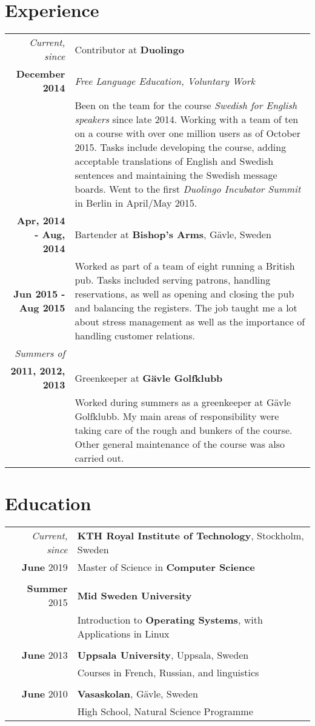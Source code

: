 \documentclass[a4paper,10pt]{article}
\begin{document}
\section{Experience}
\begin{tabular}{r|p{11cm}}
 \emph{Current, since} & Contributor at \textbf{Duolingo}\\\textbf{December 2014}&\emph{Free Language Education, Voluntary Work}\\&\footnotesize{Been on the team for the course \emph{Swedish for English speakers} since late 2014. Working with a team of ten on a course with over one million users as
 of October 2015. Tasks include developing the course, adding acceptable translations of English
 and Swedish sentences and maintaining the Swedish message boards. Went to the first \emph{Duolingo Incubator Summit} in Berlin in April/May 2015.}\\
\textbf{Apr, 2014 - Aug, 2014} & Bartender at \textbf{Bishop's Arms}, Gävle, Sweden \\ \textbf{Jun 2015 - Aug 2015}&\footnotesize{Worked as part of a team of eight running a British pub. Tasks included serving patrons, handling reservations, as well as opening and closing the pub and balancing the registers. The job taught me a lot about stress management as well as the importance of handling customer relations.}\\
\emph{Summers of}\\\textbf{2011, 2012, 2013} & Greenkeeper at \textbf{Gävle Golfklubb} \\
&\footnotesize{Worked during summers as a greenkeeper at Gävle Golfklubb. My main areas of responsibility were taking care of the rough and bunkers of the course. Other general maintenance of the course was also carried out.}
\end{tabular}

\section{Education}
\begin{tabular}{rl}
\emph{Current, since} & \textbf{KTH Royal Institute of Technology}, Stockholm, Sweden\\	
 \textbf{June} 2019 & Master of Science in \textbf{Computer Science}\\&\\
\textbf{Summer} 2015& \textbf{Mid Sweden University}\\& Introduction to \textbf{Operating Systems}, with Applications in Linux\\&\\
\textbf{June} 2013& \textbf{Uppsala University}, Uppsala, Sweden\\& Courses in French, Russian, and linguistics\\&\\
\textbf{June} 2010& \textbf{Vasaskolan}, Gävle, Sweden \\& High School, Natural Science Programme
\end{tabular}
\end{document}
